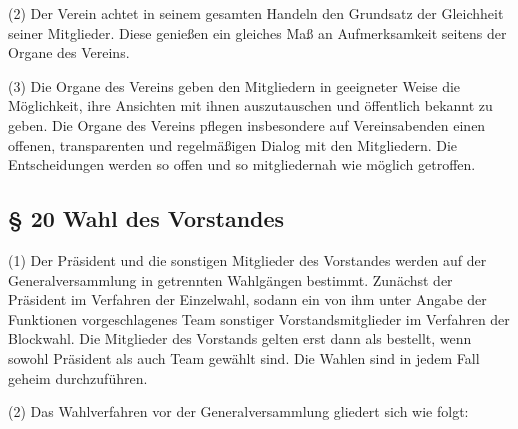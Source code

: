 \documentclass[10pt,a4paper]{article}
\begin{document}
(2)
Der Verein achtet in seinem gesamten Handeln den Grundsatz der Gleichheit seiner Mitglieder.
Diese genießen ein gleiches Maß an Aufmerksamkeit seitens der Organe des Vereins.

(3)
Die Organe des Vereins geben den Mitgliedern in geeigneter Weise die Möglichkeit, ihre Ansichten mit ihnen auszutauschen und öffentlich bekannt zu geben.
Die Organe des Vereins pflegen insbesondere auf Vereinsabenden einen offenen, transparenten und regelmäßigen Dialog mit den Mitgliedern.
Die Entscheidungen werden so offen und so mitgliedernah wie möglich getroffen.

\subsection{§ 20
Wahl des Vorstandes}

(1)
Der Präsident und die sonstigen Mitglieder des Vorstandes werden auf der Generalversammlung in getrennten Wahlgängen bestimmt.
Zunächst der Präsident im Verfahren der Einzelwahl, sodann ein von ihm unter Angabe der Funktionen vorgeschlagenes Team sonstiger Vorstandsmitglieder im Verfahren der Blockwahl.
Die Mitglieder des Vorstands gelten erst dann als bestellt, wenn sowohl Präsident als auch Team gewählt sind.
Die Wahlen sind in jedem Fall geheim durchzuführen.

(2)
Das Wahlverfahren vor der Generalversammlung gliedert sich wie folgt:
\end{document}
